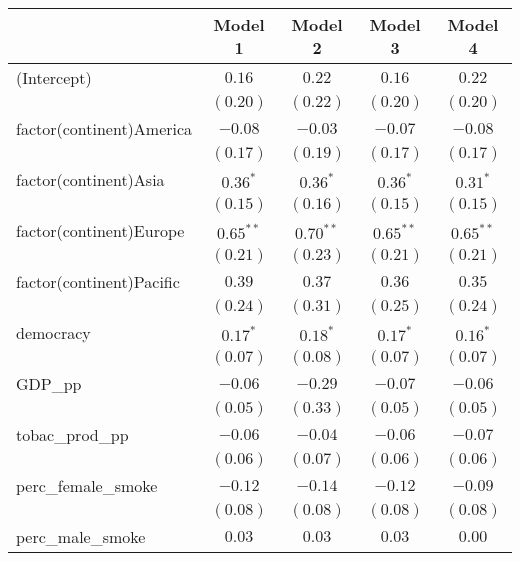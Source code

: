 
\begin{table}[!h]
\begin{center}
\begin{tabular}{l c c c c }
\toprule
 & Model 1 & Model 2 & Model 3 & Model 4 \\
\midrule
(Intercept)              & $0.16$      & $0.22$      & $0.16$      & $0.22$      \\
                         & $(0.20)$    & $(0.22)$    & $(0.20)$    & $(0.20)$    \\
factor(continent)America & $-0.08$     & $-0.03$     & $-0.07$     & $-0.08$     \\
                         & $(0.17)$    & $(0.19)$    & $(0.17)$    & $(0.17)$    \\
factor(continent)Asia    & $0.36^{*}$  & $0.36^{*}$  & $0.36^{*}$  & $0.31^{*}$  \\
                         & $(0.15)$    & $(0.16)$    & $(0.15)$    & $(0.15)$    \\
factor(continent)Europe  & $0.65^{**}$ & $0.70^{**}$ & $0.65^{**}$ & $0.65^{**}$ \\
                         & $(0.21)$    & $(0.23)$    & $(0.21)$    & $(0.21)$    \\
factor(continent)Pacific & $0.39$      & $0.37$      & $0.36$      & $0.35$      \\
                         & $(0.24)$    & $(0.31)$    & $(0.25)$    & $(0.24)$    \\
democracy                & $0.17^{*}$  & $0.18^{*}$  & $0.17^{*}$  & $0.16^{*}$  \\
                         & $(0.07)$    & $(0.08)$    & $(0.07)$    & $(0.07)$    \\
GDP\_pp                  & $-0.06$     & $-0.29$     & $-0.07$     & $-0.06$     \\
                         & $(0.05)$    & $(0.33)$    & $(0.05)$    & $(0.05)$    \\
tobac\_prod\_pp          & $-0.06$     & $-0.04$     & $-0.06$     & $-0.07$     \\
                         & $(0.06)$    & $(0.07)$    & $(0.06)$    & $(0.06)$    \\
perc\_female\_smoke      & $-0.12$     & $-0.14$     & $-0.12$     & $-0.09$     \\
                         & $(0.08)$    & $(0.08)$    & $(0.08)$    & $(0.08)$    \\
perc\_male\_smoke        & $0.03$      & $0.03$      & $0.03$      & $0.00$      \\

\end{tabular}
\end{center}
\end{table}
